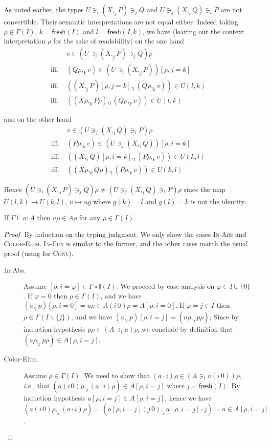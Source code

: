 \documentclass[english]{PaperTools/latex/lipics}
\newcommand\op[1]{∋_{#1}}
\def\fresh#1{\mathsf{fresh}(#1)}
\def\ie{\textit{i.e.}}
\begin{document}
\begin{remark}
  As noted earlier, the types
  $U \op i (X ,_j P) \op j Q$ and $U \op j (X ,_i Q) \op i P$
  are not convertible.
  Their semantic interpretations are not equal either.  Indeed
  taking $ρ ∈ Γ(I)$, $k = \fresh{I}$ and $l = \fresh{I,k}$,
  we have
  (leaving out the context interpretation $ρ$ for the sake of
  readability)
  on the one hand
  \begin{align*}
    &v ∈ (U \op i (X ,_j P) \op j Q) ρ
    \\
    \text{ iff. }& (Qρ ,_k v) ∈ (U \op i (X ,_j P))[ρ,j=k]
    \\
    \text{ iff. }& ((X ,_j P)[ρ,j=k] ,_l (Qρ ,_k v)) ∈ U(l,k)
    \\
    \text{ iff. }& ((Xρ ,_k Pρ) ,_l (Qρ ,_k v)) ∈ U(l,k)
  \end{align*}

  and on the other hand
  \begin{align*}
    &v ∈ (U \op j (X ,_i Q) \op i P) ρ
    \\
    \text{ iff. }& (Pρ ,_k v) ∈ (U \op j (X ,_i Q))[ρ,i=k]
    \\
    \text{ iff. }& ((X ,_i Q)[ρ,i=k] ,_l (Pρ ,_k v)) ∈ U(k,l)
    \\
    \text{ iff. }& ((Xρ ,_k Qρ) ,_l (Pρ ,_k v)) ∈ U(k,l)
  \end{align*}

  Hence $(U \op i (X ,_j P) \op j Q) ρ ≠ (U \op j (X ,_i Q) \op i P) ρ$
  since the map $U(l,k) → U(k,l)$, $u ↦ ug$ where $g(k) = l$ and $g(l)=k$
  is not the identity.
\end{remark}


\begin{theorem}[Validity]
  If $Γ ⊢ a : A$ then $aρ ∈ Aρ$ for any $ρ ∈ Γ(I)$.
\end{theorem}
\begin{proof}
  By induction on the typing judgment.  We only show the cases \textsc{In-Abs} and \textsc{Color-Elim}.  \textsc{In-Fun} is similar to the former, and the other
  cases match the usual proof (using  for \textsc{Conv}).
  \begin{description}
    \item[\sc In-Abs.]
      Assume $[ρ,i=φ] ∈ Γ∗𝕀(I)$.  We proceed by case analysis on $φ ∈ I ∪ \{0\}$.
      If $φ = 0$ then $ρ ∈ Γ(I)$, and we have
      $(a ,_i p)[ρ,i=0] = aρ ∈ A(i\,0)ρ = A[ρ,i=0]$.
      If $φ = j ∈ I$ then $ρ ∈ Γ(I\backslash\{j\})$, and we have
      $(a ,_i p)[ρ,i=j] = (aρ ,_j pρ)$;
      Since by induction hypothesis $pρ ∈ (A \op {i} a)ρ$, we conclude
      by definition that $(aρ ,_j pρ) ∈ A[ρ,i=j]$.

    \item[\sc Color-Elim.]
      Assume $ρ ∈ Γ(I)$.
      We need to show that $(a·i)ρ ∈ (A \op i {a(i\,0)})ρ$, \ie, that
      $ (a(i\,0)ρ ,_j (a·i)ρ) ∈ A[ρ,i=j]$ where $j = \fresh I$.
      By induction hypothesis $a[ρ,i=j] ∈ A[ρ,i=j]$, hence
      we have
      $(a(i\,0)ρ ,_j (a·i)ρ) = (a[ρ,i=j](j\,0) ,_j a[ρ,i=j]·j) = a ∈ A[ρ,i=j]$.
    \qedhere
  \end{description}

\end{proof}
\end{document}
